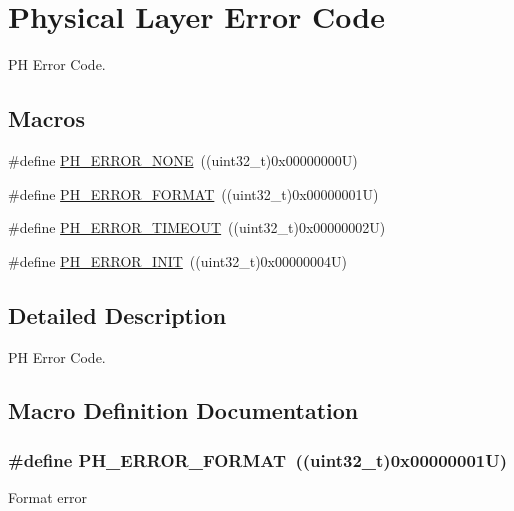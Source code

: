 \hypertarget{group___p_h___error___code}{}\section{Physical Layer Error Code}
\label{group___p_h___error___code}


PH Error Code.  


\subsection*{Macros}
\begin{DoxyCompactItemize}
\item 
\#define \hyperlink{group___p_h___error___code_ga67055c114ec03135c28e1cb6a3d68f5a}{P\+H\+\_\+\+E\+R\+R\+O\+R\+\_\+\+N\+O\+NE}~((uint32\+\_\+t)0x00000000\+U)
\item 
\#define \hyperlink{group___p_h___error___code_ga1ab3aa44f2a85855b44408e5b697667b}{P\+H\+\_\+\+E\+R\+R\+O\+R\+\_\+\+F\+O\+R\+M\+AT}~((uint32\+\_\+t)0x00000001\+U)
\item 
\#define \hyperlink{group___p_h___error___code_gaae8d2172a18fdde6957c77af378c2574}{P\+H\+\_\+\+E\+R\+R\+O\+R\+\_\+\+T\+I\+M\+E\+O\+UT}~((uint32\+\_\+t)0x00000002\+U)
\item 
\#define \hyperlink{group___p_h___error___code_ga15fbdf4edfc98283ef0f1b7c2fc0a47b}{P\+H\+\_\+\+E\+R\+R\+O\+R\+\_\+\+I\+N\+IT}~((uint32\+\_\+t)0x00000004\+U)
\end{DoxyCompactItemize}


\subsection{Detailed Description}
PH Error Code. 



\subsection{Macro Definition Documentation}
\subsubsection[{\texorpdfstring{P\+H\+\_\+\+E\+R\+R\+O\+R\+\_\+\+F\+O\+R\+M\+AT}{PH_ERROR_FORMAT}}]{\setlength{\rightskip}{0pt plus 5cm}\#define P\+H\+\_\+\+E\+R\+R\+O\+R\+\_\+\+F\+O\+R\+M\+AT~((uint32\+\_\+t)0x00000001\+U)}\hypertarget{group___p_h___error___code_ga1ab3aa44f2a85855b44408e5b697667b}{}\label{group___p_h___error___code_ga1ab3aa44f2a85855b44408e5b697667b}
Format error 
